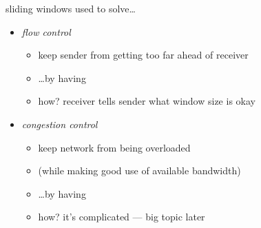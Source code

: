 \begin{frame}{sliding windows used to solve\ldots}
    \begin{itemize}
    \item \textit{flow control}
        \begin{itemize}
        \item keep sender from getting too far ahead of receiver
        \item \ldots by having 
        \item how? receiver tells sender what window size is okay
        \end{itemize}
    \item \textit{congestion control}
        \begin{itemize}
        \item keep network from being overloaded
        \item (while making good use of available bandwidth)
        \item \ldots by having 
        \item how? it's complicated --- big topic later
        \end{itemize}
    \end{itemize}
\end{frame}

